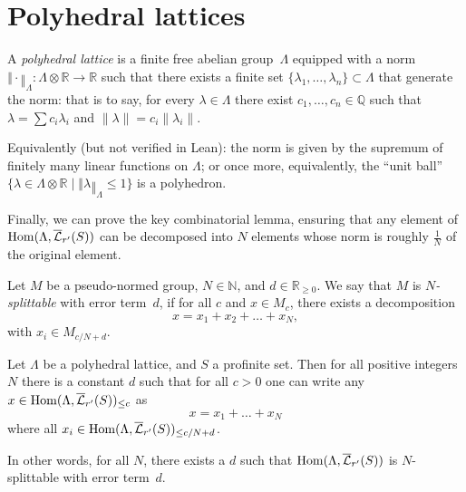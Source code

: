 \section{Polyhedral lattices}
\label{sec:polyhedral_lattice}

\begin{definition}
  \label{polyhedral_lattice}
  \leanok
  A \emph{polyhedral lattice} is a finite free abelian group~$\Lambda$
  equipped with a norm $‖\cdot‖_\Lambda \colon \Lambda\otimes \mathbb R\to \mathbb R$
  such that there exists a finite set $\{\lambda_1, \dots, \lambda_n\} \subset \Lambda$
  that generate the norm:
  that is to say, for every $\lambda \in \Lambda$ there exist
  $c_1, \dots, c_n \in \mathbb Q$ such that
  $\lambda = \sum c_i \lambda_i$ and $\|\lambda\| = c_i\|\lambda_i\|$.

  Equivalently (but not verified in Lean):
  the norm is given by the supremum of finitely many linear functions on $\Lambda$;
  or once more,
  equivalently, the ``unit ball''
  $\{\lambda\in \Lambda\otimes \mathbb R\mid ‖\lambda‖_\Lambda\leq 1\}$ is a polyhedron.
\end{definition}

Finally, we can prove the key combinatorial lemma,
ensuring that any element of $\operatorname{Hom}(\Lambda,\overline{\mathcal L}_{r'}(S))$
can be decomposed into $N$ elements whose norm is roughly $\tfrac 1N$ of the original element.

\begin{definition}
  \label{splittable}
  \leanok
  Let $M$ be a pseudo-normed group, $N \in \mathbb N$, and $d \in \mathbb R_{\ge 0}$.
  We say that $M$ is \emph{$N$-splittable} with error term~$d$,
  if for all $c$ and $x \in M_c$,
  there exists a decomposition
  \[
    x = x_1 + x_2 + \dots + x_N,
  \]
  with $x_i \in M_{c/N + d}$.
\end{definition}

\begin{proposition}
  \label{Mbar-splittable}
  \leanok
  Let $\Lambda$ be a polyhedral lattice, and $S$ a profinite set.
  Then for all positive integers $N$ there is a constant $d$
  such that for all $c>0$ one can write any
  $x\in \operatorname{Hom}(\Lambda,\overline{\mathcal L}_{r'}(S))_{\leq c}$ as
  \[
    x=x_1+\ldots+x_N
  \]
  where all $x_i\in \operatorname{Hom}(\Lambda,\overline{\mathcal L}_{r'}(S))_{\leq c/N+d}$.

  In other words, for all $N$, there exists a $d$ such that
  $\operatorname{Hom}(\Lambda, \overline{\mathcal L}_{r'}(S))$ is $N$-splittable with error term~$d$.
\end{proposition}

